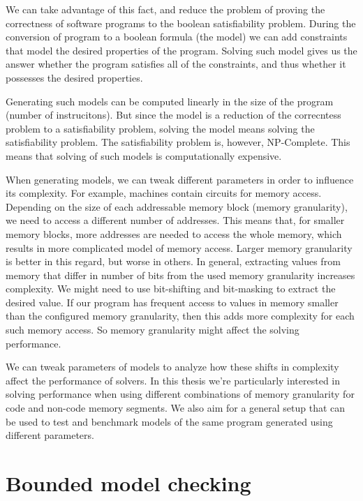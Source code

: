 \documentclass[12pt]{article}
\begin{document}
We can take advantage of this fact, and reduce the problem of proving the
correctness of software programs to the boolean satisfiability problem. During
the conversion of program to a boolean formula (the model) we can add
constraints that model the desired properties of the program. Solving such
model gives us the answer whether the program satisfies all of the constraints,
and thus whether it possesses the desired properties. 

Generating such models can be computed linearly in the size of the program
(number of instrucitons). But since the model is a reduction of the correcntess
problem to a satisfiability problem, solving the model means solving the
satisfiability problem. The satisfiability problem is, however, NP-Complete.
This means that solving of such models is computationally expensive. 

When generating models, we can tweak different parameters in order to influence
its complexity. For example, machines contain circuits for memory access.
Depending on the size of each addressable memory block (memory granularity), we
need to access a different number of addresses. This means that, for smaller
memory blocks, more addresses are needed to access the whole memory, which
results in more complicated model of memory access. Larger memory granularity
is better in this regard, but worse in others. In general, extracting values
from memory that differ in number of bits from the used memory granularity
increases complexity. We might need to use bit-shifting and bit-masking to
extract the desired value. If our program has frequent access to values in
memory smaller than the configured memory granularity, then this adds more
complexity for each such memory access. So memory granularity might affect the
solving performance.

We can tweak parameters of models to analyze how these shifts in complexity
affect the performance of solvers. In this thesis we're particularly
interested in solving performance when using different combinations of memory
granularity for code and non-code memory segments. We also aim for a general
setup that can be used to test and benchmark models of the same program
generated using different parameters. 

\newpage

\section{Bounded model checking}
\end{document}
